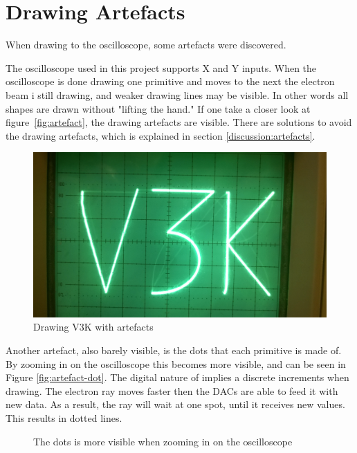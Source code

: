 \section{Drawing Artefacts}
\label{results:artefacts}
When drawing to the oscilloscope, some artefacts were discovered.

The oscilloscope used in this project supports X and Y inputs.
When the oscilloscope is done drawing one primitive and moves to the next the electron beam i still drawing,
and weaker drawing lines may be visible.
In other words all shapes are drawn without "lifting the hand."
If one take a closer look at figure~\ref{fig:artefact}, the drawing artefacts are visible.
There are solutions to avoid the drawing artefacts, which is explained in section \ref{discussion:artefacts}.

\begin{figure}[h]
	    \includegraphics[width=\linewidth]{images/artefacts.jpg}
	    \caption{Drawing V3K with artefacts}
	    \label{fig:artifact}
\end{figure}

Another artefact, also barely visible, is the dots that each primitive is made of.
By zooming in on the oscilloscope this becomes more visible, and can be seen in Figure \ref{fig:artefact-dot}.
The digital nature of \vthreek implies a discrete increments when drawing.
The electron ray moves faster then the DACs are able to feed it with new data.
As a result, the ray will wait at one spot, until it receives new values.
This results in dotted lines.

\begin{figure}[h]
	    \caption{The dots is more visible when zooming in on the oscilloscope}
	    \label{fig:artifact-dots}
\end{figure}